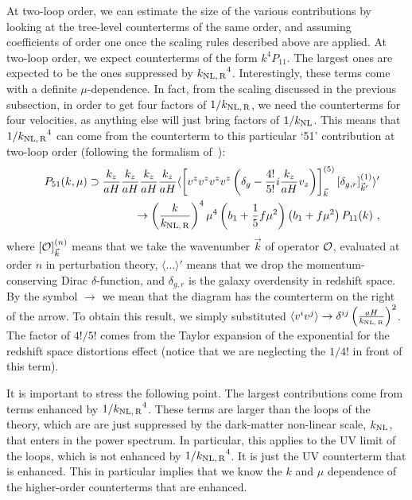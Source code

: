 \documentclass[12pt,a4paper]{article}
\def\nn{\nonumber}
\renewcommand{\(}{\left(}
\renewcommand{\)}{\right)}
\def\ba{\begin{eqnarray}}
\def\ea{\end{eqnarray}}
\def\knl{{k_{\rm NL}}}
\def\knlr{{k_{\rm NL,\,R}}}
\begin{document}
At two-loop order, we can estimate the size of the various contributions by looking at the tree-level counterterms of the same order, and assuming coefficients of order one once the scaling rules described above are applied. At two-loop order, we expect counterterms of the form $k^4P_{11}$. The largest ones are expected to be the ones suppressed by $\knlr^4$. Interestingly, these terms come with a definite $\mu$-dependence. In fact, from the scaling {discussed in the previous} subsection, in order to get four factors of $1/\knlr$, we need the counterterms for four velocities, as anything else will just {bring} factors of $1/\knl$. This means that $1/\knlr^4$ can come from the counterterm to this particular `51' contribution at two-loop order (following the formalism of~\cite{Senatore:2014eva}):
\ba\label{eq:counter1}
&&P_{51}(k,\mu)\supset \frac{k_z}{aH} \frac{k_z}{aH}\frac{k_z}{aH}\frac{k_z}{aH}\langle\left[v^z v^z v^z v^z \left(\delta_{g}-\frac{4!}{5!}i\frac{k_z}{a H}v_z\right) \right]^{(5)}_{\vec k} [\delta_{g,r}]^{(1)}_{\vec k'}\rangle'\\ \nn
&&\qquad\to \left(\frac{k}{\knlr}\right)^4\mu^4 \left(b_1+\frac{1}{5}f\mu^2\right) \left(b_1+f\mu^2\right) P_{11}(k)\ ,
\ea
where $[{\cal{O}}]^{(n)}_{\vec k}$ means that we take the wavenumber $\vec k$ of operator ${\cal{O}}$, evaluated at order $n$ in perturbation theory, $\langle\ldots \rangle'$ means that we drop the momentum-conserving Dirac $\delta$-function, and $\delta_{g,r}$ is the galaxy overdensity in redshift space. By the symbol $\to$ we mean that the diagram has the counterterm on the right of the arrow. To obtain this result, we simply substituted $\langle v^i v^j\rangle\to\delta^{ij} \left(\frac{a H}{\knlr}\right)^2$. The factor of $4!/5!$ comes from the Taylor expansion of the exponential for the redshift space distortions effect (notice that we are neglecting the $1/4!$ in front of this term).

It is important to stress the following point. The largest {contributions} come from terms enhanced by $1/\knlr^4$. These terms are larger than the loops of the theory, which are are just suppressed by the dark-matter non-linear scale, $\knl$, that enters in the power spectrum. In particular, this applies to the UV limit of the loops, which is not enhanced by $1/\knlr^4$. It is just the UV counterterm that is enhanced.  This in particular implies that we know the $k$ and $\mu$ dependence of the higher-order counterterms that are enhanced.
\end{document}
